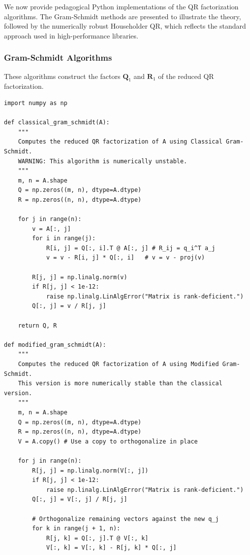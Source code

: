 \begin{proposition}
We now provide pedagogical Python implementations of the QR factorization algorithms. The Gram-Schmidt methods are presented to illustrate the theory, followed by the numerically robust Householder QR, which reflects the standard approach used in high-performance libraries.

\subsubsection*{Gram-Schmidt Algorithms}
These algorithms construct the factors $\mathbf{Q}_1$ and $\mathbf{R}_1$ of the reduced QR factorization.

\begin{verbatim}
import numpy as np

def classical_gram_schmidt(A):
    """
    Computes the reduced QR factorization of A using Classical Gram-Schmidt.
    WARNING: This algorithm is numerically unstable.
    """
    m, n = A.shape
    Q = np.zeros((m, n), dtype=A.dtype)
    R = np.zeros((n, n), dtype=A.dtype)
    
    for j in range(n):
        v = A[:, j]
        for i in range(j):
            R[i, j] = Q[:, i].T @ A[:, j] # R_ij = q_i^T a_j
            v = v - R[i, j] * Q[:, i]   # v = v - proj(v)
            
        R[j, j] = np.linalg.norm(v)
        if R[j, j] < 1e-12:
            raise np.linalg.LinAlgError("Matrix is rank-deficient.")
        Q[:, j] = v / R[j, j]
        
    return Q, R

def modified_gram_schmidt(A):
    """
    Computes the reduced QR factorization of A using Modified Gram-Schmidt.
    This version is more numerically stable than the classical version.
    """
    m, n = A.shape
    Q = np.zeros((m, n), dtype=A.dtype)
    R = np.zeros((n, n), dtype=A.dtype)
    V = A.copy() # Use a copy to orthogonalize in place
    
    for j in range(n):
        R[j, j] = np.linalg.norm(V[:, j])
        if R[j, j] < 1e-12:
            raise np.linalg.LinAlgError("Matrix is rank-deficient.")
        Q[:, j] = V[:, j] / R[j, j]
        
        # Orthogonalize remaining vectors against the new q_j
        for k in range(j + 1, n):
            R[j, k] = Q[:, j].T @ V[:, k]
            V[:, k] = V[:, k] - R[j, k] * Q[:, j]
            

\end{verbatim}
\end{proposition}
